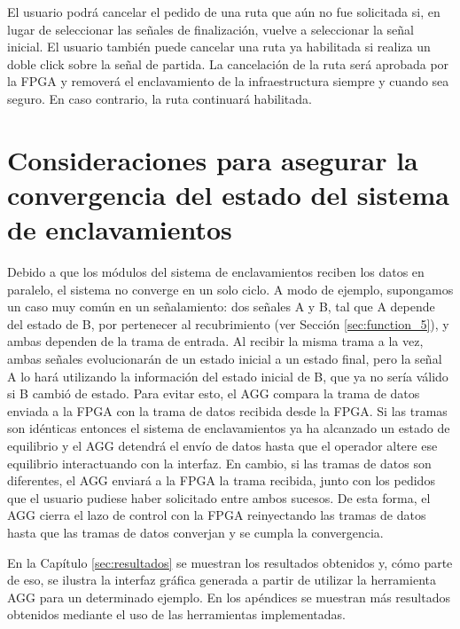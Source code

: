 	El usuario podrá cancelar el pedido de una ruta que aún no fue solicitada si, en lugar de seleccionar las señales de finalización, vuelve a seleccionar la señal inicial. El usuario también puede cancelar una ruta ya habilitada si realiza un doble click sobre la señal de partida. La cancelación de la ruta será aprobada por la FPGA y removerá el enclavamiento de la infraestructura siempre y cuando sea seguro. En caso contrario, la ruta continuará habilitada.
	
	
		
	\section{Consideraciones para asegurar la convergencia del estado del sistema de enclavamientos}
	
	Debido a que los módulos del sistema de enclavamientos reciben los datos en paralelo, el sistema no converge en un solo ciclo. A modo de ejemplo, supongamos un caso muy común en un señalamiento: dos señales A y B, tal que A depende del estado de B, por pertenecer al recubrimiento (ver Sección \ref{sec:function_5}), y ambas dependen de la trama de entrada. Al recibir la misma trama a la vez, ambas señales evolucionarán de un estado inicial a un estado final, pero la señal A lo hará utilizando la información del estado inicial de B, que ya no sería válido si B cambió de estado. Para evitar esto, el AGG compara la trama de datos enviada a la FPGA con la trama de datos recibida desde la FPGA. Si las tramas son idénticas entonces el sistema de enclavamientos ya ha alcanzado un estado de equilibrio y el AGG detendrá el envío de datos hasta que el operador altere ese equilibrio interactuando con la interfaz. En cambio, si las tramas de datos son diferentes, el AGG enviará a la FPGA la trama recibida, junto con los pedidos que el usuario pudiese haber solicitado entre ambos sucesos. De esta forma, el AGG cierra el lazo de control con la FPGA reinyectando las tramas de datos hasta que las tramas de datos converjan y se cumpla la convergencia.
	
	En la Capítulo \ref{sec:resultados} se muestran los resultados obtenidos y, cómo parte de eso, se ilustra la interfaz gráfica generada a partir de utilizar la herramienta AGG para un determinado ejemplo. En los apéndices se muestran más resultados obtenidos mediante el uso de las herramientas implementadas.

	

	